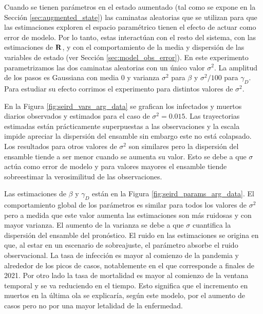 Cuando se tienen parámetros en el estado aumentado (tal como se expone en la Sección \ref{sec:augmented_state}) las caminatas aleatorias que se utilizan para que las estimaciones exploren el espacio paramétrico tienen el efecto de actuar como error de modelo. Por lo tanto, estas interactúan con el resto del sistema, con las estimaciones de $\mathbf{R}$, y con el comportamiento de la media y dispersión de las variables de estado (ver Sección \ref{sec:model_obs_error}). En este experimento parametrizamos las dos caminatas aleatorias con un único valor $\sigma^2$. La amplitud de los pasos es Gaussiana con media 0 y varianza $\sigma^2$ para $\beta$ y $\sigma^2/100$ para $\gamma_D$. Para estudiar su efecto corrimos el experimento para distintos valores de $\sigma^2$. 

En la Figura \ref{fig:seird_vars_arg_data} se grafican los infectados y muertos diarios observados y estimados para el caso de $\sigma^2 = 0.015$. Las trayectorias estimadas están prácticamente superpuestas a las observaciones y la escala impide apreciar la dispersión del ensamble sin embargo este no está colapsado. Los resultados para otros valores de $\sigma^2$ son similares pero la dispersión del ensamble tiende a ser menor cuando se aumenta su valor. Esto se debe a que $\sigma$ actúa como error de modelo y para valores mayores el ensamble tiende sobreestimar la verosimilitud de las observaciones.

Las estimaciones de $\beta$ y $\gamma_D$ están en la Figura \ref{fig:seird_params_arg_data}. El comportamiento global de los parámetros es similar para todos los valores de $\sigma^2$ pero a medida que este valor aumenta las estimaciones son más ruidosas y con mayor varianza. El aumento de la varianza se debe a que $\sigma$ cuantifica la dispersión del ensamble del pronóstico. El ruido en las estimaciones se origina en que, al estar en un escenario de sobreajuste, el parámetro absorbe el ruido observacional.
La tasa de infección es mayor al comienzo de la pandemia y alrededor de los picos de casos, notablemente en el que corresponde a finales de 2021. Por otro lado la tasa de mortalidad es mayor al comienzo de la ventana temporal y se va reduciendo en el tiempo. Esto significa que el incremento en muertos en la última ola se explicaría, según este modelo, por el aumento de casos pero no por una mayor letalidad de la enfermedad.

